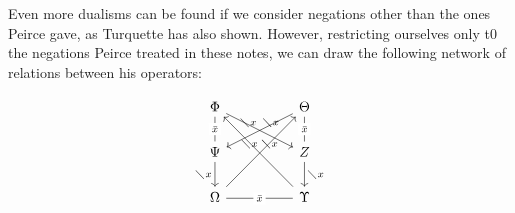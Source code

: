 Even more dualisms can be found if we consider negations other than the ones Peirce gave, as Turquette has also shown. However, restricting ourselves only t0 the negations Peirce treated in these notes, we can draw the following network of relations between his operators:


\[
\begin{tikzcd}
\Phi \arrow[d, "\bar{x}" description, no head] \arrow[rrd, "\diagdown{x}"]     &  & \Theta \arrow[d, "\bar{x}" description, no head] \arrow[lld, "\diagdown{x}"'] \\
\Psi \arrow[d, "\diagdown{x}"']                                                &  & Z \arrow[d, "\diagdown{x}"]                                                   \\
\Omega \arrow[rr, "\bar{x}" description, no head] \arrow[rruu, "\diagdown{x}"] &  & \Upsilon \arrow[lluu, "\diagdown{x}"']                                       
\end{tikzcd}
\]
